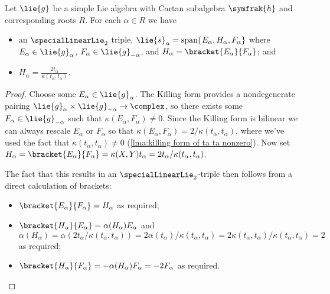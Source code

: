\documentclass[fleqn]{NotesClass}
\DeclareMathOperator{\Span}{span}
\newcommand{\csa}{\symfrak{h}}
\begin{document}
    \begin{lma}{}{}
        Let \(\lie{g}\) be a simple Lie algebra with Cartan subalgebra \(\csa\) and corresponding roots \(R\).
        For each \(\alpha \in R\) we have
        \begin{itemize}
            \item an \(\specialLinearLie_2\) triple, \(\lie{s}_\alpha = \Span\{E_\alpha, H_\alpha, F_\alpha\}\) where \(E_\alpha \in \lie{g}_\alpha\), \(F_\alpha \in \lie{g}_{-\alpha}\), and \(H_\alpha = \bracket{E_\alpha}{F_\alpha}\); and
            \item \(H_\alpha = \displaystyle \frac{2t_\alpha}{\kappa(t_\alpha, t_\alpha)}\).
        \end{itemize}
        \begin{proof}
            Choose some \(E_\alpha \in \lie{g}_\alpha\).
            The Killing form provides a nondegenerate pairing \(\lie{g}_\alpha \times \lie{g}_{-\alpha} \to \complex\), so there exists some \(F_\alpha \in \lie{g}_{-\alpha}\) such that \(\kappa(E_\alpha, F_\alpha) \ne 0\).
            Since the Killing form is bilinear we can always rescale \(E_\alpha\) or \(F_\alpha\) so that \(\kappa(E_\alpha, F_\alpha) = 2/\kappa(t_\alpha, t_\alpha)\), where we've used the fact that \(\kappa(t_\alpha, t_\alpha) \ne 0\) (\cref{lma:killing form of ta ta nonzero}).
            Now set \(H_\alpha = \bracket{E_\alpha}{F_\alpha} = \kappa(X, Y)t_\alpha = 2t_\alpha/\kappa(t_\alpha, t_\alpha)\).
            
            The fact that this results in an \(\specialLinearLie_2\)-triple then follows from a direct calculation of brackets:
            \begin{itemize}
                \item \(\bracket{E_\alpha}{F_\alpha} = H_\alpha\) as required;
                \item \(\bracket{H_\alpha}{E_\alpha} = \alpha(H_\alpha) E_\alpha\) and \(\alpha(H_\alpha) = \alpha(2t_\alpha/\kappa(t_\alpha, t_\alpha)) = 2\alpha(t_\alpha)/\kappa(t_\alpha, t_\alpha) = 2\kappa(t_\alpha, t_\alpha)/\kappa(t_\alpha, t_\alpha) = 2\) as required;
                \item \(\bracket{H_\alpha}{F_\alpha} = -\alpha(H_\alpha) F_\alpha = -2F_\alpha\) as required.
            \end{itemize}
        \end{proof}
    \end{lma}
    
\end{document}
